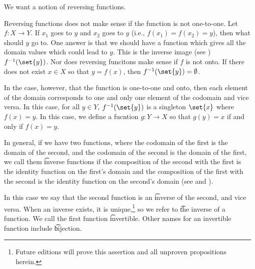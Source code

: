 

We want a notion of reversing functions.


Reversing functions does not make sense if the function is not one-to-one.
Let $f: X \to Y$.
If $x_1$ goes to $y$ and $x_2$ goes to $y$ (i.e., $f(x_1) = f(x_2) = y$), then what should $y$ go to.
One answer is that we should have a function which gives all the domain values which could lead to $y$.
This is the inverse image (see ) $f^{-1}(\set{y})$.
Nor does reversing funcitons make sense if $f$ is not onto.
If there does not exist $x \in X$ so that $y = f(x)$, then $f^{-1}(\set{y}) = \emptyset$.

In the case, however, that the function is one-to-one and onto, then each element of the domain corresponds to one and only one element of the codomain and vice versa.
In this case, for all $y \in Y$, $f^{-1}(\set{y})$ is a singleton $\set{x}$ where $f(x) = y$.
In this case, we define a fucntion $g: Y \to X$ so that $g(y) = x$ if and only if $f(x) = y$.


In general, if we have two functions, where the codomain of the first is the domain of the second, and the codomain of the second is the domain of the first, we call them \t{inverse functions} if the composition of the second with the first is the identity function on the first's domain and the composition of the first with the second is the identity function on the second's domain (see  and ).

In this case we say that the second function is an \t{inverse} of the second, and vice versa.
When an inverse exists, it is unique,\footnote{Future editions will prove this assertion and all unproven propositions herein.} so we refer to \t{the inverse} of a function.
We call the first function \t{invertible}.
Other names for an invertible function include \t{bijection}.


